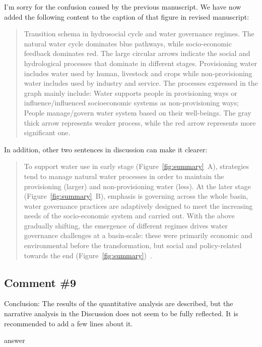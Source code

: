 \AR{} I'm sorry for the confusion caused by the previous manuscript. We have now added the following content to the caption of that figure in revised manuscript:

\begin{quote}
    Transition schema in hydrosocial cycle and water governance regimes. The natural water cycle dominates blue pathways, while socio-economic feedback dominates red.
    The large circular arrows indicate the social and hydrological processes that dominate in different stages.
    Provisioning water includes water used by human, livestock and crops while non-provisioning water includes used by industry and service.
    The processes expressed in the graph mainly include: Water supports people in provisioning ways or influence/influenced socioeconomic systems as non-provisioning ways; People manage/govern water system based on their well-beings.
    The gray thick arrow represents weaker process, while the red arrow represents more significant one.
\end{quote}

\AR*{} In addition, other two sentences in discussion can make it clearer:

\begin{quote}
    To support water use in early stage (Figure~\ref{fig:summary}~A), strategies tend to manage natural water processes in order to maintain the provisioning (larger) and non-provisioning water (less).
    At the later stage (Figure~\ref{fig:summary}~B), emphasis is governing across the whole basin, water governance practices are adaptively designed to meet the increasing needs of the socio-economic system and carried out.
    With the above gradually shifting, the emergence of different regimes drives water governance challenges at a basin-scale: these were primarily economic and environmental before the transformation, but social and policy-related towards the end (Figure~\ref{fig:summary})~\cite{singh2019,porcher2019}.
\end{quote}

\subsection{Comment \#9}
\RC{} Conclusion: The results of the quantitative analysis are described, but the narrative analysis in the Discussion does not seem to be fully reflected. It is recommended to add a few lines about it.

\AR{} answer
